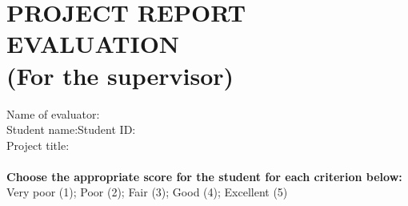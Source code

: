 \section*{PROJECT REPORT EVALUATION\\\fontsize{14pt}{0pt}\selectfont \vspace{4pt}\textnormal{(For the supervisor)}}
\thispagestyle{empty}
\vspace{-16pt}
\hspace{-1cm}Name of evaluator:\dotfill\\
Student name:\dotfill Student ID:\dotfill\\
Project title:\dotfill\\
\\
\textbf{Choose the appropriate score for the student for each criterion below:}\\
Very poor (1); Poor (2); Fair (3); Good (4); Excellent (5)
